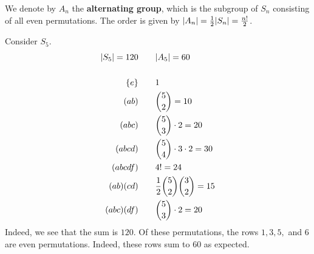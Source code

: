 \begin{defn}
    We denote by $ A_{n} $ the \textbf{alternating group},
    which is the subgroup of $ S_{n} $ consisting of all even permutations. \vsp
    The order is given by $ \abs{A_{n}} = \frac{1}{2}\abs{S_{n}} = \frac{n!}{2} $.
\end{defn}

\begin{xmp}[source=Primary Source Material]
    Consider $ S_{5} $.
    \begin{align*}
        \abs{S_{5}} = 120 \quad & \quad \abs{A_{5}} = 60 \\ \ \\
        \left\{{e}\right\} \quad & \quad 1 \\
        (ab) \quad & \quad \binom 5 2 = 10 \\
        (abc) \quad & \quad \binom 5 3 \cdot 2 = 20 \\
        (abcd) \quad & \quad \binom 5 4 \cdot 3 \cdot 2 = 30 \\
        (abcdf) \quad & \quad 4! = 24 \\
        (ab)(cd) \quad & \quad \frac{1}{2}\binom 5 2 \binom 3 2 = 15 \\
        (abc)(df) \quad & \quad \binom 5 3 \cdot 2 = 20
    \end{align*}
    Indeed, we see that the sum is $ 120 $.
    Of these permutations, the rows $ 1, 3, 5, $ and $ 6 $ are even permutations.
    Indeed, these rows sum to $ 60 $ as expected.
\end{xmp}

